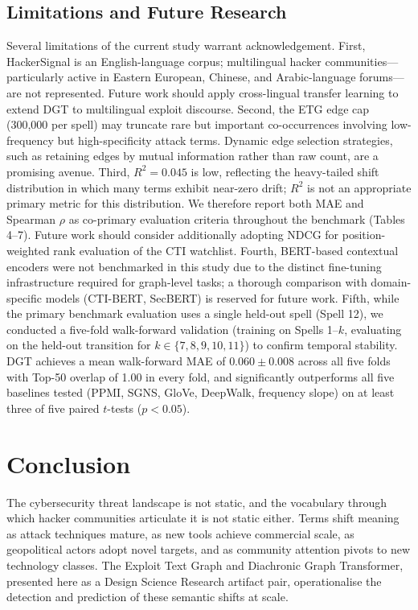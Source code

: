 \documentclass[12pt]{article}
\begin{document}
\subsection{Limitations and Future Research}

Several limitations of the current study warrant acknowledgement. First, HackerSignal is an English-language corpus; multilingual hacker communities---particularly active in Eastern European, Chinese, and Arabic-language forums---are not represented. Future work should apply cross-lingual transfer learning \parencite{ebrahimi2022} to extend DGT to multilingual exploit discourse. Second, the ETG edge cap (300,000 per spell) may truncate rare but important co-occurrences involving low-frequency but high-specificity attack terms. Dynamic edge selection strategies, such as retaining edges by mutual information rather than raw count, are a promising avenue. Third, $R^2 = 0.045$ is low, reflecting the heavy-tailed shift distribution in which many terms exhibit near-zero drift; $R^2$ is not an appropriate primary metric for this distribution. We therefore report both MAE and Spearman $\rho$ as co-primary evaluation criteria throughout the benchmark (Tables 4--7). Future work should consider additionally adopting NDCG for position-weighted rank evaluation of the CTI watchlist. Fourth, BERT-based contextual encoders were not benchmarked in this study due to the distinct fine-tuning infrastructure required for graph-level tasks; a thorough comparison with domain-specific models (CTI-BERT, SecBERT) is reserved for future work. Fifth, while the primary benchmark evaluation uses a single held-out spell (Spell 12), we conducted a five-fold walk-forward validation (training on Spells 1--$k$, evaluating on the held-out transition for $k \in \{7,8,9,10,11\}$) to confirm temporal stability. DGT achieves a mean walk-forward MAE of $0.060 \pm 0.008$ across all five folds with Top-50 overlap of 1.00 in every fold, and significantly outperforms all five baselines tested (PPMI, SGNS, GloVe, DeepWalk, frequency slope) on at least three of five paired $t$-tests ($p < 0.05$).

\section{Conclusion}
\bodyfont

The cybersecurity threat landscape is not static, and the vocabulary through which hacker communities articulate it is not static either. Terms shift meaning as attack techniques mature, as new tools achieve commercial scale, as geopolitical actors adopt novel targets, and as community attention pivots to new technology classes. The Exploit Text Graph and Diachronic Graph Transformer, presented here as a Design Science Research artifact pair, operationalise the detection and prediction of these semantic shifts at scale.
\end{document}
